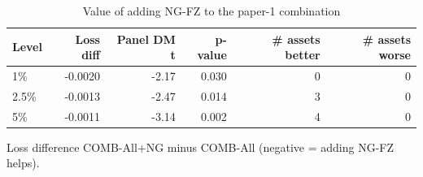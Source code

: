 \begin{table}[htbp]
\centering
\footnotesize
\caption{Value of adding NG-FZ to the paper-1 combination}
\label{tab:combo_ng}
\begin{tabular}{lrrrrr}
\toprule
Level & Loss diff & Panel DM t & p-value & \# assets better & \# assets worse \\
\midrule
1\% & -0.0020 & -2.17 & 0.030 & 0 & 0 \\
2.5\% & -0.0013 & -2.47 & 0.014 & 3 & 0 \\
5\% & -0.0011 & -3.14 & 0.002 & 4 & 0 \\
\bottomrule
\end{tabular}
\par\smallskip\parbox{\linewidth}{\scriptsize Loss difference COMB-All+NG minus COMB-All (negative = adding NG-FZ helps).}
\end{table}